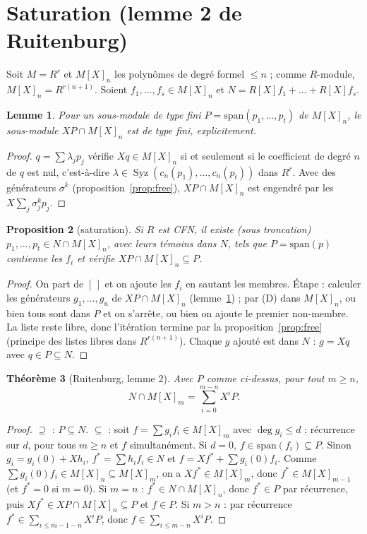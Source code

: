 \documentclass[11pt]{amsart}
\newtheorem{theorem}{Théorème}
\newtheorem{proposition}[theorem]{Proposition}
\newtheorem{lemma}[theorem]{Lemme}
\theoremstyle{definition}
\theoremstyle{remark}
\DeclareMathOperator{\Syz}{Syz}
\newcommand{\sm}{\mathrm{span}}
\begin{document}
\section{Saturation (lemme 2 de Ruitenburg)}\label{sec:sat}

Soit $M=R^r$ et $M[X]_n$ les polynômes de degré formel $\le n$ ; comme
$R$-module, $M[X]_n=R^{r(n+1)}$. Soient $f_1,\dots,f_s\in M[X]_n$ et
$N=R[X]f_1+\dots+R[X]f_s$.

\begin{lemma}\label{lem:step}
Pour un sous-module de type fini $P=\sm(p_1,\dots,p_t)$ de $M[X]_n$,
le sous-module $XP\cap M[X]_n$ est de type fini, explicitement.
\end{lemma}

\begin{proof}
$q=\sum\lambda_jp_j$ vérifie $Xq\in M[X]_n$ si et seulement si le
coefficient de degré $n$ de $q$ est nul, c'est-à-dire
$\lambda\in\Syz(c_n(p_1),\dots,c_n(p_t))$ dans $R^r$. Avec des
générateurs $\sigma^k$ (proposition~\ref{prop:free}), $XP\cap M[X]_n$
est engendré par les $X\sum_j\sigma^k_jp_j$.
\end{proof}

\begin{proposition}[saturation]\label{prop:sat}
Si $R$ est CFN, il existe (sous troncation) $p_1,\dots,p_t\in N\cap M[X]_n$,
avec leurs témoins dans $N$, tels que $P=\sm(p)$ contienne les $f_i$ et
vérifie $XP\cap M[X]_n\subseteq P$.
\end{proposition}

\begin{proof}
On part de $[\,]$ et on ajoute les $f_i$ en sautant les membres. Étape :
calculer les générateurs $g_1,\dots,g_u$ de $XP\cap M[X]_n$
(lemme~\ref{lem:step}) ; par (D) dans $M[X]_n$, ou bien tous sont dans
$P$ et on s'arrête, ou bien on ajoute le premier non-membre. La liste
reste libre, donc l'itération termine par la
proposition~\ref{prop:free} (principe des listes libres dans
$R^{r(n+1)}$). Chaque $g$ ajouté est dans $N$ : $g=Xq$ avec $q\in P\subseteq N$.
\end{proof}

\begin{theorem}[Ruitenburg, lemme 2]\label{thm:sat}
Avec $P$ comme ci-dessus, pour tout $m\ge n$,
\[N\cap M[X]_m=\textstyle\sum_{i=0}^{m-n}X^iP.\]
\end{theorem}

\begin{proof}
$\supseteq$ : $P\subseteq N$. $\subseteq$ : soit $f=\sum g_if_i\in M[X]_m$
avec $\deg g_i\le d$ ; récurrence sur $d$, pour tous $m\ge n$ et $f$
simultanément. Si $d=0$, $f\in\sm(f_i)\subseteq P$. Sinon
$g_i=g_i(0)+Xh_i$, $f^*=\sum h_if_i\in N$ et $f=Xf^*+\sum g_i(0)f_i$.
Comme $\sum g_i(0)f_i\in M[X]_n\subseteq M[X]_m$, on a $Xf^*\in M[X]_m$,
donc $f^*\in M[X]_{m-1}$ (et $f^*=0$ si $m=0$). Si $m=n$ : $f^*\in N\cap M[X]_n$,
donc $f^*\in P$ par récurrence, puis $Xf^*\in XP\cap M[X]_n\subseteq P$
et $f\in P$. Si $m>n$ : par récurrence $f^*\in\sum_{i\le m-1-n}X^iP$,
donc $f\in\sum_{i\le m-n}X^iP$.
\end{proof}
\end{document}
